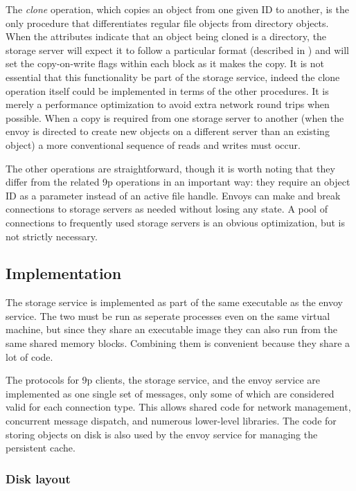 The \emph{clone} operation, which copies an object from one given ID to another, is the only procedure that differentiates regular file objects from directory objects. When the attributes indicate that an object being cloned is a directory, the storage server will expect it to follow a particular format (described in ) and will set the copy-on-write flags within each block as it makes the copy. It is not essential that this functionality be part of the storage service, indeed the clone operation itself could be implemented in terms of the other procedures. It is merely a performance optimization to avoid extra network round trips when possible. When a copy is required from one storage server to another (when the envoy is directed to create new objects on a different server than an existing object) a more conventional sequence of reads and writes must occur.

The other operations are straightforward, though it is worth noting that they differ from the related 9p operations in an important way: they require an object ID as a parameter instead of an active file handle. Envoys can make and break connections to storage servers as needed without losing any state. A pool of connections to frequently used storage servers is an obvious optimization, but is not strictly necessary.

\subsection{Implementation}

The storage service is implemented as part of the same executable as the envoy service. The two must be run as seperate processes even on the same virtual machine, but since they share an executable image they can also run from the same shared memory blocks. Combining them is convenient because they share a lot of code.

The protocols for 9p clients, the storage service, and the envoy service are implemented as one single set of messages, only some of which are considered valid for each connection type. This allows shared code for network management, concurrent message dispatch, and numerous lower-level libraries. The code for storing objects on disk is also used by the envoy service for managing the persistent cache.

\subsubsection{Disk layout}

